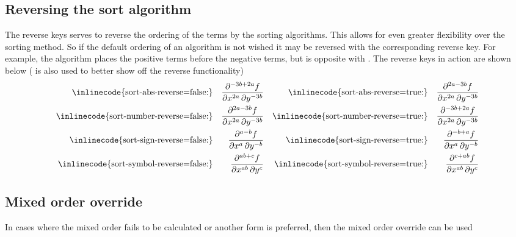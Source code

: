 	\subsection{Reversing the sort algorithm} \label{ssec:sort-reverse}
	The reverse keys serves to reverse the ordering of the terms by the sorting algorithms. This allows for even greater flexibility over the sorting method. So if the default ordering of an algorithm is not wished it may be reversed with the corresponding reverse key. For example, the  algorithm places the positive terms before the negative terms, but is opposite with . The reverse keys in action are shown below ( is also used to better show off the reverse functionality)
	\begin{align*}
		\text{\inlinecode{sort-abs-reverse=false:}}    && \pdv[sort-method={abs}, sort-abs-reverse=false, order={2a, -3b}]{f}{x,y}       &&
		\text{\inlinecode{sort-abs-reverse=true:}}     && \pdv[sort-method={abs}, sort-abs-reverse=true, order={2a, -3b}]{f}{x,y}        \\
		\text{\inlinecode{sort-number-reverse=false:}} && \pdv[sort-method={number}, sort-number-reverse=false, order={2a, -3b}]{f}{x,y} &&
		\text{\inlinecode{sort-number-reverse=true:}}  && \pdv[sort-method={number}, sort-number-reverse=true, order={2a, -3b}]{f}{x,y}  \\
		\text{\inlinecode{sort-sign-reverse=false:}}   && \pdv[sort-method={sign}, sort-sign-reverse=false, order={a, -b}]{f}{x,y}       &&
		\text{\inlinecode{sort-sign-reverse=true:}}    && \pdv[sort-method={sign}, sort-sign-reverse=true, order={a, -b}]{f}{x,y}        \\
		\text{\inlinecode{sort-symbol-reverse=false:}} && \pdv[sort-method={symbol}, sort-symbol-reverse=false, order={ab, c}]{f}{x,y}   &&
		\text{\inlinecode{sort-symbol-reverse=true:}}  && \pdv[sort-method={symbol}, sort-symbol-reverse=true, order={ab, c}]{f}{x,y}
	\end{align*}
	
	\subsection{Mixed order override}
	In cases where the mixed order fails to be calculated or another form is preferred, then the mixed order override can be used
	\begin{example}
		 \\
	\end{example}
	
